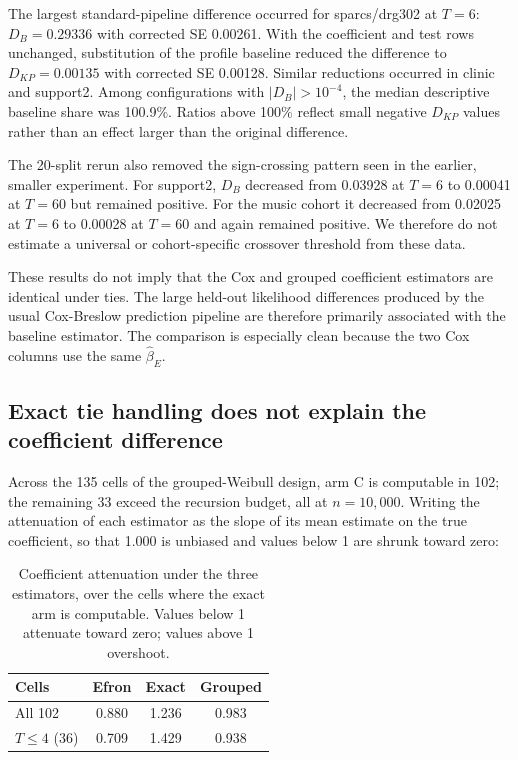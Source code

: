 \documentclass[smallextended,natbib]{svjour3}
\begin{document}
The largest standard-pipeline difference occurred for sparcs/drg302 at $T=6$: $D_B=0.29336$ with corrected SE 0.00261. With the coefficient and test rows unchanged, substitution of the profile baseline reduced the difference to $D_{KP}=0.00135$ with corrected SE 0.00128. Similar reductions occurred in clinic and support2. Among configurations with $|D_B|>10^{-4}$, the median descriptive baseline share was 100.9\%. Ratios above 100\% reflect small negative $D_{KP}$ values rather than an effect larger than the original difference.

The 20-split rerun also removed the sign-crossing pattern seen in the earlier, smaller experiment. For support2, $D_B$ decreased from 0.03928 at $T=6$ to 0.00041 at $T=60$ but remained positive. For the music cohort it decreased from 0.02025 at $T=6$ to 0.00028 at $T=60$ and again remained positive. We therefore do not estimate a universal or cohort-specific crossover threshold from these data.

These results do not imply that the Cox and grouped coefficient estimators are identical under ties. The large held-out likelihood differences produced by the usual Cox-Breslow prediction pipeline are therefore primarily associated with the baseline estimator. The comparison is especially clean because the two Cox columns use the same $\widehat\beta_E$.

\subsection{Exact tie handling does not explain the coefficient difference}
\label{sec:results-exact}

Across the 135 cells of the grouped-Weibull design, arm C is computable in 102; the remaining 33 exceed the recursion budget, all at $n=10{,}000$. Writing the attenuation of each estimator as the slope of its mean estimate on the true coefficient, so that 1.000 is unbiased and values below 1 are shrunk toward zero:

\begin{table}[htbp]
\centering
\caption{Coefficient attenuation under the three estimators, over the cells where the exact arm is computable. Values below 1 attenuate toward zero; values above 1 overshoot.}
\label{tab:attenuation}
\begin{tabular}{lccc}
\hline
Cells & Efron & Exact & Grouped \\
\hline
All 102 & 0.880 & 1.236 & 0.983 \\
$T\le 4$ (36) & 0.709 & 1.429 & 0.938 \\
\hline
\end{tabular}
\end{table}
\end{document}
